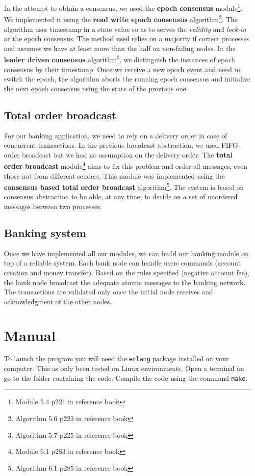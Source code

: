 \documentclass[11pt,english,a4paper]{article}
\begin{document}
In the attempt to obtain a consensus, we used the \textbf{epoch consensus} module\footnote{Module 5.4 p221 in reference book}.
We implemented it using the \textbf{read write epoch consensus} algorithm\footnote{Algorithm 5.6 p223 in reference book}.
The algorithm uses timestamp in a state value so as to serves the \emph{validity} and \emph{lock-in} or the epoch consensus.
The method used relies on a majority if correct processes and assumes we have at least more than the half on non-failing nodes.
In the \textbf{leader driven consensus} algorithm\footnote{Algorithm 5.7 p225 in reference book}, we distinguish the instances of epoch consensus by their timestamp.
Once we receive a new epoch event and need to switch the epoch, the algorithm
aborts the running epoch consensus and initialize the next epoch consensus using the state of the previous one.

\subsection*{Total order broadcast}
For our banking application, we need to rely on a delivery order in case of concurrent transactions.
In the previous broadcast abstraction, we used FIFO-order broadcast but we had no assumption on the delivery order.
The \textbf{total order broadcast} module\footnote{Module 6.1 p283 in reference book} aims to fix this problem and order all messages, even those not from different senders.
This module was implemented using the \textbf{consensus based total order broadcast} algorithm\footnote{Algorithm 6.1 p285 in reference book}.
The system is based on consensus abstraction to be able, at any time, to decide on a set of unordered messages between two processes.

\subsection*{Banking system}
Once we have implemented all our modules, we can build our banking module on top of a reliable system.
Each bank node can handle users commands (account creation and money transfer).
Based on the rules specified (negative account fee), the bank node broadcast the adequate atomic messages to the banking network.
The transactions are validated only once the initial node receives and acknowledgment of the other nodes.

\section{Manual}
To launch the program you will need the \texttt{erlang} package installed on your computer.
This as only been tested on Linux environments.
Open a terminal an go to the folder containing the code.
Compile the code using the command \texttt{make}.\\
\end{document}
